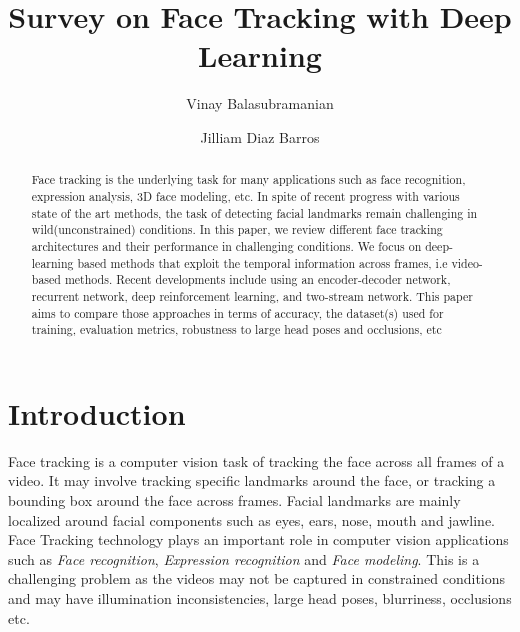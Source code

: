 \documentclass{llncs}
\begin{document}
\pagestyle{headings}  %

%
\title{Survey on Face Tracking with Deep Learning}
%
%
\author{Vinay Balasubramanian \and Jilliam Diaz Barros}
%
%

\maketitle              %

\begin{abstract}
Face tracking is the underlying task for many applications such as face recognition, expression analysis, 3D face modeling, etc. In spite of recent progress with various state of the art methods, the task of detecting facial landmarks remain challenging in wild(unconstrained) conditions. 
In this paper, we review different face tracking architectures and their performance in challenging conditions. We focus on deep-learning based methods that exploit the temporal information across frames, i.e video-based methods. Recent developments include using an encoder-decoder network, recurrent network, deep reinforcement learning, and two-stream network. This paper aims to compare those approaches in terms of accuracy, the dataset(s) used for training, evaluation metrics, robustness to large head poses and occlusions, etc
\end{abstract}


\section{Introduction}
Face tracking is a computer vision task of tracking the face across all frames of a video. It may involve tracking specific landmarks around the face, or tracking a bounding box around the face across frames. Facial landmarks are mainly localized around facial components such as eyes, ears, nose, mouth and jawline.
Face Tracking technology plays an important role in computer vision applications such as \textit{Face recognition}\cite{face_recognition}, \textit{Expression recognition}\cite{expression_recognition} and \textit{Face modeling}\cite{face_modeling}. This is a challenging problem as the videos may not be captured in constrained conditions and may have illumination inconsistencies, large head poses, blurriness, occlusions etc.
\end{document}
